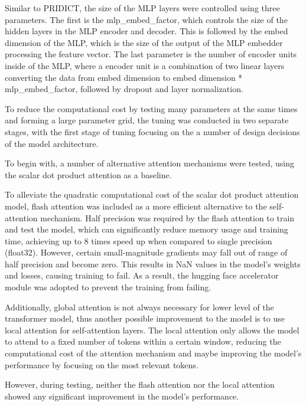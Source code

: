 Similar to PRIDICT, the size of the MLP layers were controlled using three parameters. The first is the mlp\_embed\_factor, which controls the size of the hidden layers in the MLP encoder and decoder. This is followed by the embed dimension of the MLP, which is the size of the output of the MLP embedder processing the feature vector. The last parameter is the number of encoder units inside of the MLP, where a encoder unit is a combination of two linear layers converting the data from embed dimension to embed dimension * mlp\_embed\_factor, followed by dropout and layer normalization.

To reduce the computational cost by testing many parameters at the same times and forming a large parameter grid, the tuning was conducted in two separate stages, with the first stage of tuning focusing on the a number of design decisions of the model architecture. 

To begin with, a number of alternative attention mechanisms were tested, using the scalar dot product attention as a baseline. 

To alleviate the quadratic computational cost of the scalar dot product attention model, flash attention was included as a more efficient alternative to the self-attention mechanism. Half precision was required by the flash attention to train and test the model, which can significantly reduce memory usage and training time, achieving up to 8 times speed up when compared to single precision (float32)\cite{micikeviciusMixedPrecisionTraining2018}. However, certain small-magnitude gradients may fall out of range of half precision and become zero. This results in NaN values in the model's weights and losses, causing training to fail. As a result, the hugging face accelerator module was adopted to prevent the training from failing. 

Additionally, global attention is not always necessary for lower level of the transformer model\cite{raeTransformersNeedDeep2020}, thus another 
possible improvement to the model is to use local attention for self-attention layers. The local attention only allows the model to attend to a fixed number of tokens within a certain window, reducing the computational cost of the attention mechanism and maybe improving the model's performance by focusing on the most relevant tokens.

However, during testing, neither the flash attention nor the local attention showed any significant improvement in the model's performance.

